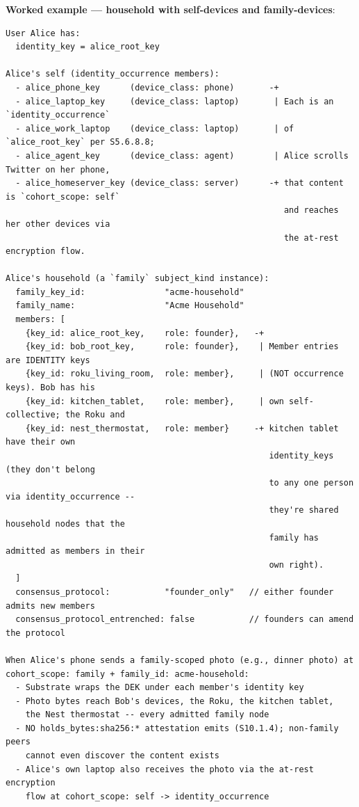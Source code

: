 \documentclass[11pt]{article}
\begin{document}
\textbf{Worked example — household with self-devices and family-devices}:


\begin{lstlisting}
User Alice has:
  identity_key = alice_root_key

Alice's self (identity_occurrence members):
  - alice_phone_key      (device_class: phone)       -+
  - alice_laptop_key     (device_class: laptop)       | Each is an `identity_occurrence`
  - alice_work_laptop    (device_class: laptop)       | of `alice_root_key` per S5.6.8.8;
  - alice_agent_key      (device_class: agent)        | Alice scrolls Twitter on her phone,
  - alice_homeserver_key (device_class: server)      -+ that content is `cohort_scope: self`
                                                        and reaches her other devices via
                                                        the at-rest encryption flow.

Alice's household (a `family` subject_kind instance):
  family_key_id:                "acme-household"
  family_name:                  "Acme Household"
  members: [
    {key_id: alice_root_key,    role: founder},   -+
    {key_id: bob_root_key,      role: founder},    | Member entries are IDENTITY keys
    {key_id: roku_living_room,  role: member},     | (NOT occurrence keys). Bob has his
    {key_id: kitchen_tablet,    role: member},     | own self-collective; the Roku and
    {key_id: nest_thermostat,   role: member}     -+ kitchen tablet have their own
                                                     identity_keys (they don't belong
                                                     to any one person via identity_occurrence --
                                                     they're shared household nodes that the
                                                     family has admitted as members in their
                                                     own right).
  ]
  consensus_protocol:           "founder_only"   // either founder admits new members
  consensus_protocol_entrenched: false           // founders can amend the protocol

When Alice's phone sends a family-scoped photo (e.g., dinner photo) at
cohort_scope: family + family_id: acme-household:
  - Substrate wraps the DEK under each member's identity key
  - Photo bytes reach Bob's devices, the Roku, the kitchen tablet,
    the Nest thermostat -- every admitted family node
  - NO holds_bytes:sha256:* attestation emits (S10.1.4); non-family peers
    cannot even discover the content exists
  - Alice's own laptop also receives the photo via the at-rest encryption
    flow at cohort_scope: self -> identity_occurrence


\end{lstlisting}
\end{document}
